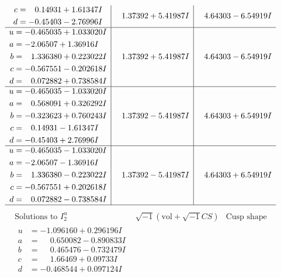 \documentclass[1p]{elsarticle_modified}
\theoremstyle{definition}
\newcommand{\I}{\sqrt{-1}}
\begin{document}
$$\begin{array}{c|c|c}
\begin{aligned}
c &= \phantom{-}0.14931 + 1.61347 I \\
d &= -0.45403 - 2.76996 I\end{aligned}
 & \phantom{-}1.37392 + 5.41987 I & \phantom{-}4.64303 - 6.54919 I \\ \hline\begin{aligned}
u &= -0.465035 + 1.033020 I \\
a &= -2.06507 + 1.36916 I \\
b &= \phantom{-}1.336380 + 0.223022 I \\
c &= -0.567551 - 0.202618 I \\
d &= \phantom{-}0.072882 + 0.738584 I\end{aligned}
 & \phantom{-}1.37392 + 5.41987 I & \phantom{-}4.64303 - 6.54919 I \\ \hline\begin{aligned}
u &= -0.465035 - 1.033020 I \\
a &= \phantom{-}0.568091 + 0.326292 I \\
b &= -0.323623 + 0.760243 I \\
c &= \phantom{-}0.14931 - 1.61347 I \\
d &= -0.45403 + 2.76996 I\end{aligned}
 & \phantom{-}1.37392 - 5.41987 I & \phantom{-}4.64303 + 6.54919 I \\ \hline\begin{aligned}
u &= -0.465035 - 1.033020 I \\
a &= -2.06507 - 1.36916 I \\
b &= \phantom{-}1.336380 - 0.223022 I \\
c &= -0.567551 + 0.202618 I \\
d &= \phantom{-}0.072882 - 0.738584 I\end{aligned}
 & \phantom{-}1.37392 - 5.41987 I & \phantom{-}4.64303 + 6.54919 I\\
 \hline 
 \end{array}$$\newpage$$\begin{array}{c|c|c}  
\text{Solutions to }I^u_{2}& \I (\text{vol} + \sqrt{-1}CS) & \text{Cusp shape}\\
 \hline 
\begin{aligned}
u &= -1.096160 + 0.296196 I \\
a &= \phantom{-}0.650082 - 0.890833 I \\
b &= \phantom{-}0.465476 - 0.732479 I \\
c &= \phantom{-}1.66469 + 0.09733 I \\
d &= -0.468544 + 0.097124 I\end{aligned}

\end{array}$$
\end{document}
